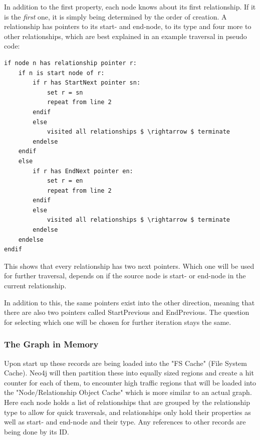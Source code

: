 In addition to the first property, each node knows about its first relationship. If it is the \emph{first} one, it is simply being determined by the order of creation. A relationship has pointers to its start- and end-node, to its type and four more to other relationships, which are best explained in an example traversal in pseudo code:
\newpage
\lstset{language=JavaScript}
\begin{lstlisting}[caption={Algorithm to Save Read the Graph from Disk}]
if node n has relationship pointer r: 
	if n is start node of r: 
		if r has StartNext pointer sn: 
			set r = sn 
			repeat from line 2 
		endif 
		else  
			visited all relationships $ \rightarrow $ terminate
		endelse 
	endif 
	else 
		if r has EndNext pointer en: 
			set r = en 
			repeat from line 2 
		endif 
		else
			visited all relationships $ \rightarrow $ terminate
		endelse 
	endelse 
endif
\end{lstlisting}

This shows that every relationship has two next pointers. Which one will be used for further traversal, depends on if the source node is start- or end-node in the current relationship.

In addition to this, the same pointers exist into the other direction, meaning that there are also two pointers called StartPrevious and EndPrevious. The question for selecting which one will be chosen for further iteration stays the same.

\subsubsection{The Graph in Memory}
Upon start up these records are being loaded into the "FS Cache" (File System Cache). Neo4j will then partition these into equally sized regions and create a hit counter for each of them, to encounter high traffic regions that will be loaded into the "Node/Relationship Object Cache" which is more similar to an actual graph. \\
Here each node holds a list of relationships that are grouped by the relationship type to allow for quick traversals, and relationships only hold their properties as well as start- and end-node and their type. Any references to other records are being done by its ID. 

